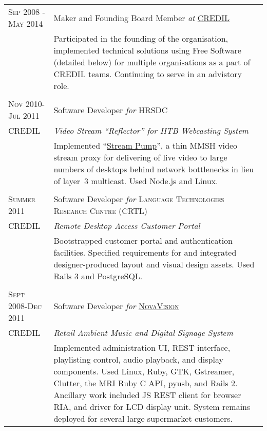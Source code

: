 \documentclass[letterpaper,10pt]{article}
\begin{document}
\begin{longtable}{p{3cm}|p{12cm}}
  \textsc{Sep 2008 - May 2014} & Maker and Founding Board Member \emph{at} \href{http://credil.org/}{\textsc{CREDIL}} \\
   & \footnotesize{Participated in the founding of the organisation, implemented technical solutions using Free Software (detailed below) for multiple organisations as a part of CREDIL teams.  Continuing to serve in an advistory role.} \\
\multicolumn{2}{c}{} \\
  \textsc{Nov 2010-Jul 2011} & Software Developer \emph{for} \textsc{HRSDC} \\
  \tiny{CREDIL} & \emph{Video Stream ``Reflector'' for IITB Webcasting System} \\
   & \footnotesize{Implemented ``{\href{https://github.com/orospakr/stream-pump}{Stream Pump}}'', a thin MMSH video stream proxy for delivering of live video to large numbers of desktops behind network bottlenecks in lieu of \mbox{layer 3} \mbox{multicast}.  Used Node.js and Linux.} \\
\multicolumn{2}{c}{} \\
  \textsc{Summer 2011} & Software Developer \emph{for} \textsc{Language Technologies Research Centre (CRTL)} \\
  \tiny{CREDIL} & \emph{Remote Desktop Access Customer Portal} \\
   & \footnotesize{Bootstrapped customer portal and authentication facilities.  Specified requirements for and integrated designer-produced layout and visual design assets.  Used Rails 3 and PostgreSQL.} \\
  \multicolumn{2}{c}{} \\
  \textsc{Sept 2008-Dec 2011} & Software Developer \emph{for} \href{http://www.novavision.ca/}{\textsc{NovaVision}} \\
  \tiny{CREDIL} & \emph{Retail Ambient Music and Digital Signage System} \\
   & \footnotesize{Implemented administration UI, REST interface, playlisting control, audio playback, and display components.  Used Linux, Ruby, GTK, Gstreamer, Clutter, the MRI Ruby C API, pyusb, and Rails 2.  Ancillary work included JS REST client for browser RIA, and driver for LCD display unit.  System remains deployed for several large supermarket customers.} \\
\end{longtable}
\end{document}
